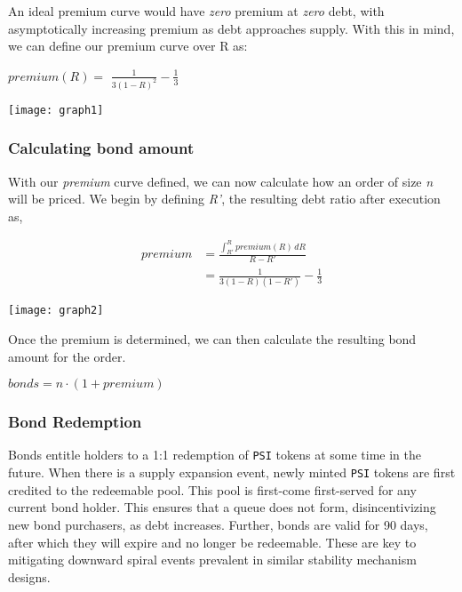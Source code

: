 \documentclass[a4paper, 12pt]{article}
\begin{document}
	An ideal premium curve would have \textit{zero} premium at \textit{zero} debt, with asymptotically increasing premium as debt approaches supply. With this in mind, we can define our premium 			curve over R as:
	
	\begin{center}

		$premium(R) = $ \Large{$\frac{1}{3(1 - R)^2} - \frac{1}{3}$}

	\end{center}

	\begin{center}

		\texttt{[image: graph1]}

	\end{center}

	\newpage

	\subsubsection{Calculating bond amount}
	With our \textit{premium} curve defined, we can now calculate how an order of size \textit{n} will be priced. We begin by defining \textit{R'}, the resulting debt ratio after execution as,
	\begin{center}
		\begin{equation}
		\label{eq1}
			\begin{split}
				premium & = \frac{\int_{R'}^{R} premium(R)\, dR}{R - R'}\\
				& = \frac{1}{3(1 - R)(1 - R')} - \frac{1}{3}
			\end{split}
		\end{equation}
	\end{center}
	
	\begin{center}
		\texttt{[image: graph2]}
	\end{center}
	
	Once the premium is determined, we can then calculate the resulting bond amount for the order.
	
	\begin{center}
		$bonds = n \cdot (1 + premium)$
	\end{center}

	\subsubsection{Bond Redemption}
	Bonds entitle holders to a 1:1 redemption of \texttt{PSI} tokens at some time in the future. When there is a supply expansion event, newly minted \texttt{PSI} tokens are first credited to the 					redeemable pool. This pool is first-come first-served for any current bond holder.
	This ensures that a queue does not form, disincentivizing new bond purchasers, as debt increases. Further, bonds are valid for 90 days, after which they will expire and no longer be redeemable. These 	are key to mitigating downward spiral events prevalent in similar stability mechanism designs.
\end{document}
